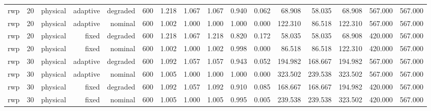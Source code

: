 \begin{tabular}{lrrrrrrrrrrrrrrr}
rwp & 20 & physical & adaptive & degraded & 600 & 1.218 & 1.067 & 1.067 & 0.940 & 0.062 & 68.908 & 58.035 & 68.908 & 567.000 & 567.000 \\
rwp & 20 & physical & adaptive & nominal & 600 & 1.002 & 1.000 & 1.000 & 1.000 & 0.000 & 122.310 & 86.518 & 122.310 & 567.000 & 567.000 \\
rwp & 20 & physical & fixed & degraded & 600 & 1.218 & 1.067 & 1.218 & 0.820 & 0.172 & 58.035 & 58.035 & 68.908 & 420.000 & 567.000 \\
rwp & 20 & physical & fixed & nominal & 600 & 1.002 & 1.000 & 1.002 & 0.998 & 0.000 & 86.518 & 86.518 & 122.310 & 420.000 & 567.000 \\
rwp & 30 & physical & adaptive & degraded & 600 & 1.092 & 1.057 & 1.057 & 0.943 & 0.052 & 194.982 & 168.667 & 194.982 & 567.000 & 567.000 \\
rwp & 30 & physical & adaptive & nominal & 600 & 1.005 & 1.000 & 1.000 & 1.000 & 0.000 & 323.502 & 239.538 & 323.502 & 567.000 & 567.000 \\
rwp & 30 & physical & fixed & degraded & 600 & 1.092 & 1.057 & 1.092 & 0.910 & 0.085 & 168.667 & 168.667 & 194.982 & 420.000 & 567.000 \\
rwp & 30 & physical & fixed & nominal & 600 & 1.005 & 1.000 & 1.005 & 0.995 & 0.005 & 239.538 & 239.538 & 323.502 & 420.000 & 567.000 \\
\bottomrule
\end{tabular}